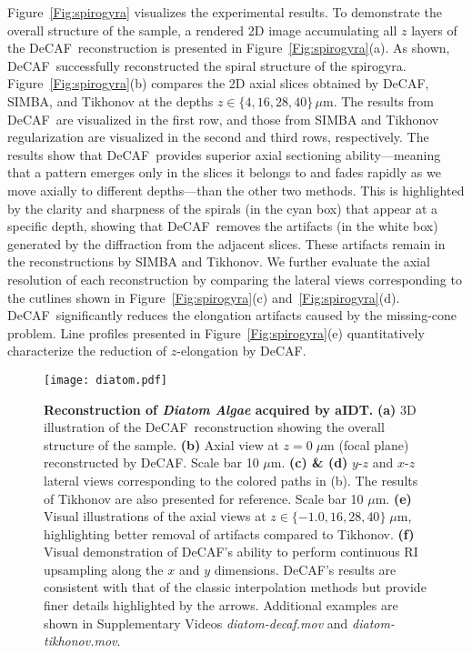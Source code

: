 \documentclass[11pt]{article}
\theoremstyle{plain} %
\def\proposed{DeCAF}
\begin{document}
Figure~\ref{Fig:spirogyra} visualizes the experimental results.
To demonstrate the overall structure of the sample, a rendered 2D image accumulating all $z$ layers of the \proposed~reconstruction is presented in Figure~\ref{Fig:spirogyra}(a). 
As shown, \proposed~successfully reconstructed the spiral structure of the spirogyra.
Figure~\ref{Fig:spirogyra}(b) compares the 2D axial slices obtained by \proposed, SIMBA, and Tikhonov at the depths $z\in\{4, 16, 28, 40\}\,\mu\text{m}$.
The results from \proposed~are visualized in the first row, and those from SIMBA and Tikhonov regularization are visualized in the second and third rows, respectively. 
The results show that \proposed~provides superior axial sectioning ability---meaning that a pattern emerges only in the slices it belongs to and fades rapidly as we move axially to different depths---than the other two methods. This is highlighted by the clarity and sharpness of the spirals (in the cyan box) that appear at a specific depth, showing that \proposed~removes the artifacts (in the white box) generated by the diffraction from the adjacent slices. These artifacts remain in the reconstructions by SIMBA and Tikhonov.
We further evaluate the axial resolution of each reconstruction by comparing the lateral views corresponding to the cutlines shown in Figure~\ref{Fig:spirogyra}(c) and~\ref{Fig:spirogyra}(d). \proposed~significantly reduces the elongation artifacts caused by the missing-cone problem. 
Line profiles presented in Figure~\ref{Fig:spirogyra}(e) quantitatively characterize the reduction of $z$-elongation by \proposed.

\begin{figure}[t!]
\begin{center}
\texttt{[image: diatom.pdf]}
\end{center}
\caption{
\textbf{Reconstruction of \emph{Diatom Algae} acquired by aIDT.} 
\textbf{(a)} 3D illustration of the \proposed~reconstruction showing the overall structure of the  sample.
\textbf{(b)} Axial view at $z=0\;\mu$m (focal plane) reconstructed by \proposed. Scale bar 10 $\mu$m.
\textbf{(c) \& (d)} $y$-$z$ and $x$-$z$ lateral views corresponding to the colored paths in (b). The results of Tikhonov are also presented for reference. Scale bar 10 $\mu$m. 
\textbf{(e)} Visual illustrations of the axial views at $z\in\{-1.0, 16, 28, 40\}\;\mu$m, highlighting better removal of artifacts compared to Tikhonov.
\textbf{(f)} Visual demonstration of \proposed's ability to perform continuous RI upsampling along the $x$ and $y$ dimensions. \proposed's results are consistent with that of the classic interpolation methods but provide finer details highlighted by the arrows.
Additional examples are shown in Supplementary Videos \emph{diatom-decaf.mov} and \emph{diatom-tikhonov.mov}.
}
\label{Fig:diatom}
\end{figure}
\end{document}
